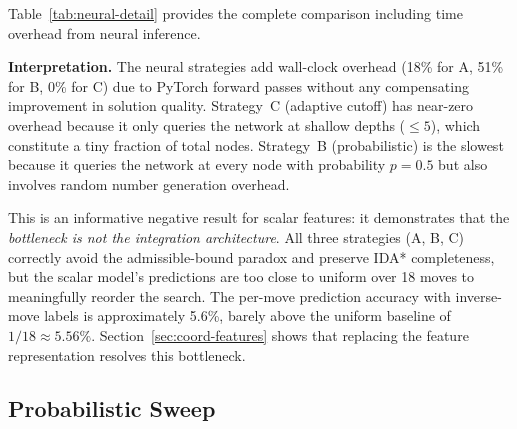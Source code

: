 \documentclass[conference]{IEEEtran}
\begin{document}
Table~\ref{tab:neural-detail} provides the complete comparison including time overhead from neural inference.

\begin{table}[htbp]
\centering
\caption{Neural strategy comparison (200 scrambles, seed 42, $K{=}5$).}
\label{tab:neural-detail}
\end{table}

\textbf{Interpretation.} The neural strategies add wall-clock overhead (18\% for A, 51\% for B, 0\% for C) due to PyTorch forward passes without any compensating improvement in solution quality. Strategy~C (adaptive cutoff) has near-zero overhead because it only queries the network at shallow depths ($\leq 5$), which constitute a tiny fraction of total nodes. Strategy~B (probabilistic) is the slowest because it queries the network at every node with probability $p=0.5$ but also involves random number generation overhead.

This is an informative negative result for scalar features: it demonstrates that the \emph{bottleneck is not the integration architecture}. All three strategies (A, B, C) correctly avoid the admissible-bound paradox and preserve IDA* completeness, but the scalar model's predictions are too close to uniform over 18 moves to meaningfully reorder the search. The per-move prediction accuracy with inverse-move labels is approximately 5.6\%, barely above the uniform baseline of $1/18 \approx 5.56\%$. Section~\ref{sec:coord-features} shows that replacing the feature representation resolves this bottleneck.

\FloatBarrier
\subsection{Probabilistic Sweep}
\label{sec:probsweep}
\end{document}

